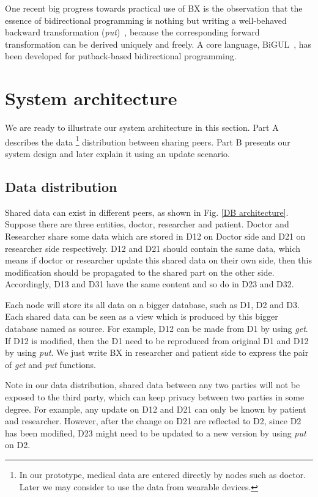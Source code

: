 \documentclass[conference]{IEEEtran}
\begin{document}
	One recent big progress towards practical use of BX is the observation that the essence of bidirectional programming is nothing but writing a well-behaved backward transformation (\emph{put})~\cite{hu2014validity, pacheco2014monadic, pacheco2014biflux}, because the corresponding forward transformation can be derived uniquely and freely. A core language, BiGUL~\cite{bigul}, has been developed for putback-based bidirectional programming.
    
\section{System architecture}
\label{system}
     We are ready to illustrate our system architecture in this section. Part A describes the data \footnote{
	 In our prototype, medical data are entered directly by nodes such as doctor. Later we may consider to use the data from wearable devices.} distribution between sharing peers. Part B presents our system design and later explain it using an update scenario.

\subsection{Data distribution}

Shared data can exist in different peers, as shown in Fig. \ref{DB architecture}. Suppose there are three entities, doctor, researcher and patient. Doctor and Researcher share some data which are stored in D12 on Doctor side and D21 on researcher side respectively. D12 and D21 should contain the same data, which means if doctor or researcher update this shared data on their own side, then this modification should be propagated to the shared part on the other side. Accordingly, D13 and D31 have the same content and so do in D23 and D32.

Each node will store its all data on a bigger database, such as D1, D2 and D3. Each shared data can be seen as a view which is produced by this bigger database named as source. For example, D12 can be made from D1 by using \emph{get}. If D12 is modified, then the D1 need to be reproduced from original D1 and D12 by using \emph{put}. We just write BX in researcher and patient side to express the pair of \emph{get} and \emph{put} functions.

Note in our data distribution, shared data between any two parties will not be exposed to the third party, which can keep privacy between two parties in some degree. For example, any update on D12 and D21 can only be known by patient and researcher. However, after the change on D21 are reflected to D2, since D2 has been modified, D23 might need to be updated to a new version by using \emph{put} on D2.
\end{document}
